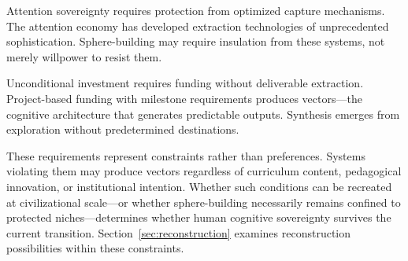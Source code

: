 Attention sovereignty requires protection from optimized capture mechanisms. The attention economy has developed extraction technologies of unprecedented sophistication. Sphere-building may require insulation from these systems, not merely willpower to resist them.

Unconditional investment requires funding without deliverable extraction. Project-based funding with milestone requirements produces vectors---the cognitive architecture that generates predictable outputs. Synthesis emerges from exploration without predetermined destinations.

These requirements represent constraints rather than preferences. Systems violating them may produce vectors regardless of curriculum content, pedagogical innovation, or institutional intention. Whether such conditions can be recreated at civilizational scale---or whether sphere-building necessarily remains confined to protected niches---determines whether human cognitive sovereignty survives the current transition. Section~\ref{sec:reconstruction} examines reconstruction possibilities within these constraints.

% 
%
%
%
%
%
%
